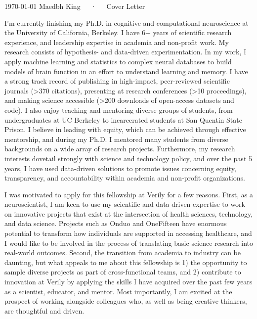 \documentclass[9pt, a4paper]{maedbh-cv}
\begin{document}
\makecvheader[R]

\makecvfooter
  {\today}
  {Maedbh King~~~·~~~Cover Letter}
  {}
  
\makelettertitle

\begin{cvletter}

I'm currently finishing my Ph.D. in cognitive and computational neuroscience at the University of California, Berkeley. I have 6+ years of scientific research experience, and leadership expertise in academia and non-profit work. My research consists of hypothesis- and data-driven experimentation. In my work, I apply machine learning and statistics to complex neural databases to build models of brain function in an effort to understand learning and memory. I have a strong track record of publishing in high-impact, peer-reviewed scientific journals (>370 citations), presenting at research conferences (>10 proceedings), and making science accessible (>200 downloads of open-access datasets and code). I also enjoy teaching and mentoring diverse groups of students, from undergraduates at UC Berkeley to incarcerated students at San Quentin State Prison. I believe in leading with equity, which can be achieved through effective mentorship, and during my Ph.D. I mentored many students from diverse backgrounds on a wide array of research projects. Furthermore, my research interests dovetail strongly with science and technology policy, and over the past 5 years, I have used data-driven solutions to promote issues concerning equity, transparency, and accountability within academia and non-profit organizations. 

I was motivated to apply for this fellowship at Verily for a few reasons. First, as a neuroscientist, I am keen to use my scientific and data-driven expertise to work on innovative projects that exist at the intersection of health sciences, technology, and data science. Projects such as Onduo and OneFifteen have enormous potential to transform how individuals are supported in accessing healthcare, and I would like to be involved in the process of translating basic science research into real-world outcomes. Second, the transition from academia to industry can be daunting, but what appeals to me about this fellowship is 1) the opportunity to sample diverse projects as part of cross-functional teams, and 2) contribute to innovation at Verily by applying the skills I have acquired over the past few years as a scientist, educator, and mentor. Most importantly, I am excited at the prospect of working alongside colleagues who, as well as being creative thinkers, are thoughtful and driven. 


\end{cvletter}
\end{document}

